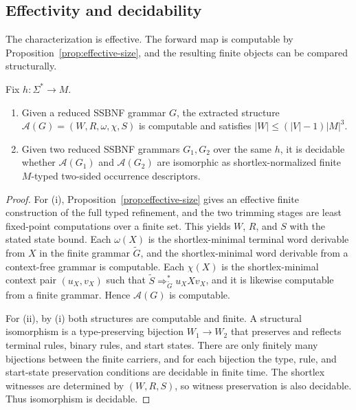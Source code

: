 \documentclass[sub]{jalc}
\newcommand{\Gtrim}{\widetilde G}
\begin{document}
\subsection{Effectivity and decidability}
\label{subsec:effectivity}

The characterization is effective. The forward map is computable by Proposition~\ref{prop:effective-size}, and the resulting finite objects can be compared structurally.

\begin{corollary}
\label{cor:decidable-iso}
Fix \(h:\Sigma^*\to M\).
\begin{enumerate}[label=\textup{(\roman*)},leftmargin=2.2em]
\item Given a reduced SSBNF grammar \(G\), the extracted structure \(\mathcal A(G)=(W,R,\omega,\chi,S)\) is computable and satisfies \(|W|\le (|V|-1)|M|^3\).
\item Given two reduced SSBNF grammars \(G_1,G_2\) over the same \(h\), it is decidable whether \(\mathcal A(G_1)\) and \(\mathcal A(G_2)\) are isomorphic as shortlex-normalized finite \(M\)-typed two-sided occurrence descriptors.
\end{enumerate}
\end{corollary}

\begin{proof}
For (i), Proposition~\ref{prop:effective-size} gives an effective finite construction of the full typed refinement, and the two trimming stages are least fixed-point computations over a finite set. This yields \(W\), \(R\), and \(S\) with the stated state bound. Each \(\omega(X)\) is the shortlex-minimal terminal word derivable from \(X\) in the finite grammar \(\Gtrim\), and the shortlex-minimal word derivable from a context-free grammar is computable. Each \(\chi(X)\) is the shortlex-minimal context pair \((u_X,v_X)\) such that \(\widetilde S\Rightarrow_{\Gtrim}^*u_XXv_X\), and it is likewise computable from a finite grammar. Hence \(\mathcal A(G)\) is computable.

For (ii), by (i) both structures are computable and finite. A structural isomorphism is a type-preserving bijection \(W_1\to W_2\) that preserves and reflects terminal rules, binary rules, and start states. There are only finitely many bijections between the finite carriers, and for each bijection the type, rule, and start-state preservation conditions are decidable in finite time. The shortlex witnesses are determined by \((W,R,S)\), so witness preservation is also decidable. Thus isomorphism is decidable.
\end{proof}
\end{document}
